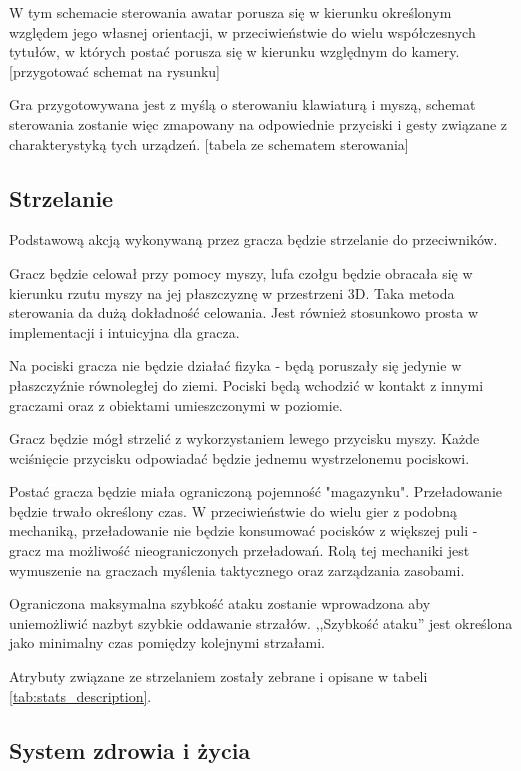 W tym schemacie sterowania awatar porusza się w kierunku określonym względem jego własnej orientacji, w przeciwieństwie do wielu współczesnych tytułów, w których postać porusza się w kierunku względnym do kamery. [przygotować schemat na rysunku]

Gra przygotowywana jest z myślą o sterowaniu klawiaturą i myszą, schemat sterowania zostanie więc zmapowany na odpowiednie przyciski i gesty związane z charakterystyką tych urządzeń. [tabela ze schematem sterowania]


\subsection{Strzelanie}\label{sec:shooting_concept}

Podstawową akcją wykonywaną przez gracza będzie strzelanie do przeciwników.

Gracz będzie celował przy pomocy myszy, lufa czołgu będzie obracała się w kierunku rzutu myszy na jej płaszczyznę w przestrzeni 3D.
Taka metoda sterowania da dużą dokładność celowania. Jest również stosunkowo prosta w implementacji i intuicyjna dla gracza.

Na pociski gracza nie będzie działać fizyka - będą poruszały się jedynie w płaszczyźnie równoległej do ziemi. Pociski będą wchodzić w kontakt z innymi graczami oraz z obiektami umieszczonymi w poziomie.

Gracz będzie mógł strzelić z wykorzystaniem lewego przycisku myszy. Każde wciśnięcie przycisku odpowiadać będzie jednemu wystrzelonemu pociskowi.

Postać gracza będzie miała ograniczoną pojemność "magazynku". Przeładowanie będzie trwało określony czas. W przeciwieństwie do wielu gier z podobną mechaniką, przeładowanie nie będzie konsumować pocisków z większej puli - gracz ma możliwość nieograniczonych przeładowań. Rolą tej mechaniki jest wymuszenie na graczach myślenia taktycznego oraz zarządzania zasobami.


Ograniczona maksymalna szybkość ataku zostanie wprowadzona aby uniemożliwić nazbyt szybkie oddawanie strzałów. ,,Szybkość ataku'' jest określona jako minimalny czas pomiędzy kolejnymi strzałami.

Atrybuty związane ze strzelaniem zostały zebrane i opisane w tabeli \ref{tab:stats_description}. 

\subsection{System zdrowia i życia}

